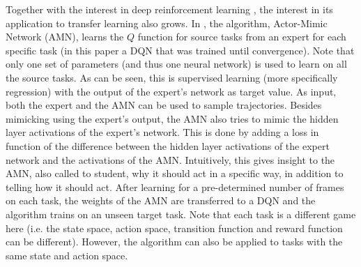 Together with the interest in deep reinforcement learning \citep{Mnih2015Human-levelLearning,Mnih2016AsynchronousLearning}, the interest in its application to transfer learning also grows. In \cite{DBLP:journals/corr/ParisottoBS15}, the algorithm, Actor-Mimic Network (AMN), learns the $Q$ function for source tasks from an expert for each specific task (in this paper a DQN that was trained until convergence).
Note that only one set of parameters (and thus one neural network) is used to learn on all the source tasks. As can be seen, this is supervised learning (more specifically regression) with the output of the expert's network as target value. As input, both the expert and the AMN can be used to sample trajectories.
Besides mimicking using the expert's output, the AMN also tries to mimic the hidden layer activations of the expert's network. This is done by adding a loss in function of the difference between the hidden layer activations of the expert network and the activations of the AMN. Intuitively, this gives insight to the AMN, also called to student, why it should act in a specific way, in addition to telling how it should act.
After learning for a pre-determined number of frames on each task, the weights of the AMN are transferred to a DQN and the algorithm trains on an unseen target task.
Note that each task is a different game here (i.e. the state space, action space, transition function and reward function can be different). However, the algorithm can also be applied to tasks with the same state and action space.
